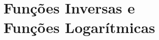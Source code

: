 \chapter[Funções Inversas e Funções Logarítmicas]%
        {Funções Inversas e\\Funções Logarítmicas}
\label{cap:funcoes_inversas_funcoes_logaritmicas}

\minitoc







